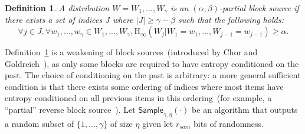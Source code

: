 \documentclass[11pt]{article}
\newcommand{\defref}[1]{\mbox{Definition~\ref{#1}}}
\newcommand{\class}[1]{{\ensuremath{\mathsf{#1}}}}
\newcommand{\sample}{\ensuremath{\class{Sample}}\xspace}
\newcommand{\Hoo}{\mathrm{H}_\infty}
\newtheorem{definition}[theorem]{Definition}
\begin{document}
\begin{definition}
\label{def:partial source}
A distribution $W = W_1,..., W_\gamma$ is an $(\alpha, \beta)$-partial block source if there exists a set of indices $J$ where $|J| \geq \gamma - \beta$ such that the following holds:
\[
\forall j\in J, \forall w_1,..., w_\gamma \in W_1,..., W_\gamma, \Hoo(W_j | W_1 = w_1,..., W_{j-1}=w_{j-1}) \geq \alpha.
\]
\end{definition}
\defref{def:partial source} is a weakening of block sources~(introduced by Chor and Goldreich~\cite{DBLP:journals/siamcomp/ChorG88}), as only some blocks are required to have entropy conditioned on the past.  The choice of conditioning on the past is arbitrary: a more general sufficient condition is that there exists some ordering of indices where most items have entropy conditioned on all previous items in this ordering~(for example, a ``partial'' reverse block source~\cite{vadhan2003constructing}).
Let $\sample_{\gamma, \eta}(\cdot)$ be an algorithm that  outputs a random subset of $\{1,..., \gamma\}$ of size $\eta$ given let $r_{sam}$ bits of randomness.
\end{document}
